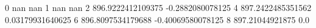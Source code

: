 0 nan nan
1 nan nan
2 896.9222412109375 -0.2882080078125
4 897.2422485351562 0.03179931640625
6 896.8097534179688 -0.40069580078125
8 897.21044921875 0.0
